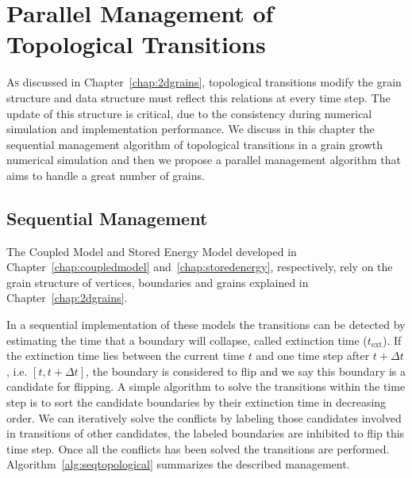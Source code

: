 \chapter{Parallel Management of Topological Transitions}
\label{chap:parallelflip}

\lettrine{A}{s} discussed in Chapter~\ref{chap:2dgrains}, topological transitions modify the grain structure and data structure must reflect this relations at every time step. 
The update of this structure is critical, due to the consistency during numerical simulation and implementation performance. 
We discuss in this chapter the sequential management algorithm of topological transitions in a grain growth numerical simulation and then we propose a parallel management algorithm that aims to handle a great number of grains.

\section{Sequential Management}

The Coupled Model and Stored Energy Model developed in Chapter~\ref{chap:coupledmodel} and~\ref{chap:storedenergy}, respectively, rely on the grain structure of vertices, boundaries and grains explained in Chapter~\ref{chap:2dgrains}.

In a sequential implementation of these models the transitions can be detected by estimating the time that a boundary will collapse, called extinction time ($t_{\text{ext}}$). 
If the extinction time lies between the current time $t$ and one time step after $t+\Delta t$, i.e. $[t, t + \Delta t]$, the boundary is considered to flip and we say this boundary is a candidate for flipping.
A simple algorithm to solve the transitions within the time step is to sort the candidate boundaries by their extinction time in decreasing order. 
We can iteratively solve the conflicts by labeling those candidates involved in transitions of other candidates, the labeled boundaries are inhibited to flip this time step. 
Once all the conflicts has been solved the transitions are performed. Algorithm~\ref{alg:seqtopological} summarizes the described management.


